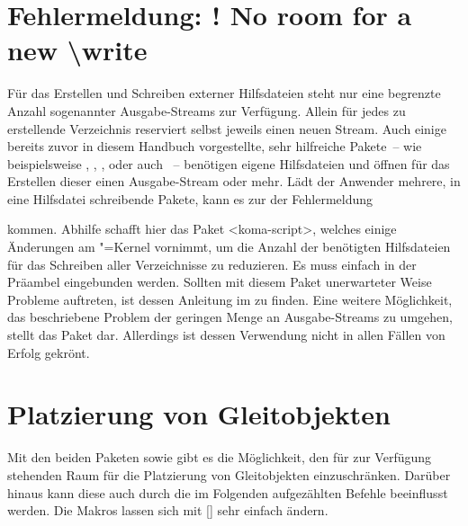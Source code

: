 \section{Fehlermeldung: ! No room for a new \textbackslash write}
%
Für das Erstellen und Schreiben externer Hilfsdateien steht  nur 
eine begrenzte Anzahl sogenannter Ausgabe-Streams zur Verfügung. Allein für 
jedes zu erstellende Verzeichnis reserviert  selbst jeweils einen 
neuen Stream. Auch einige bereits zuvor in diesem Handbuch vorgestellte, sehr 
hilfreiche Pakete~-- wie beispielsweise , , 
,  oder auch ~-- 
benötigen eigene Hilfsdateien und öffnen für das Erstellen dieser einen 
Ausgabe-Stream oder mehr. Lädt der Anwender mehrere, in eine Hilfsdatei 
schreibende Pakete, kann es zur der Fehlermeldung
%
\begin{quoting}
\end{quoting}
%
kommen. Abhilfe schafft hier das Paket <koma-script>, welches 
einige Änderungen am "=Kernel vornimmt, um die Anzahl der 
benötigten Hilfsdateien für das Schreiben aller Verzeichnisse zu reduzieren. Es 
muss einfach in der Präambel eingebunden werden. Sollten mit diesem Paket 
unerwarteter Weise Probleme auftreten, ist dessen Anleitung im \scrguide zu 
finden. Eine weitere Möglichkeit, das beschriebene Problem der geringen Menge 
an Ausgabe-Streams zu umgehen, stellt das Paket  dar. 
Allerdings ist dessen Verwendung nicht in allen Fällen von Erfolg gekrönt.



\section{Platzierung von Gleitobjekten}
%
%
%
Mit den beiden Paketen  sowie  gibt es die 
Möglichkeit, den für  zur Verfügung stehenden Raum für die 
Platzierung von Gleitobjekten einzuschränken. Darüber hinaus kann diese auch 
durch die im Folgenden aufgezählten Befehle beeinflusst werden. Die Makros 
lassen sich mit [] 
sehr einfach ändern.

